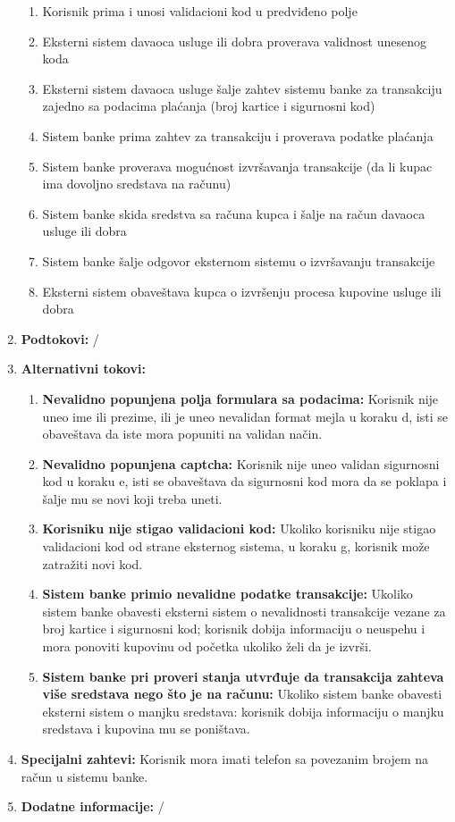 \documentclass{article}
\begin{document}
\begin{enumerate}
\begin{enumerate}
        \item Korisnik prima i unosi validacioni kod u predviđeno polje
        \item Eksterni sistem davaoca usluge ili dobra proverava validnost unesenog koda
        \item Eksterni sistem davaoca usluge šalje zahtev sistemu banke za transakciju zajedno sa podacima plaćanja (broj kartice i sigurnosni kod)
        \item Sistem banke prima zahtev za transakciju i proverava podatke plaćanja
        \item Sistem banke proverava mogućnost izvršavanja transakcije (da li kupac ima dovoljno sredstava na računu)
        \item Sistem banke skida sredstva sa računa kupca i šalje na račun davaoca usluge ili dobra
        \item Sistem banke šalje odgovor eksternom sistemu o izvršavanju transakcije
        \item Eksterni sistem obaveštava kupca o izvršenju procesa kupovine usluge ili dobra
    \end{enumerate}
  \item \textbf{Podtokovi: } /
  \item \textbf{Alternativni tokovi: }
    \begin{enumerate}
        \item \textbf{Nevalidno popunjena polja formulara sa podacima: } Korisnik nije uneo ime ili prezime, ili je uneo nevalidan format mejla u koraku d, isti se obaveštava da iste mora popuniti na validan način.
        \item \textbf{Nevalidno popunjena captcha: } Korisnik nije uneo validan sigurnosni kod u koraku e, isti se obaveštava da sigurnosni kod mora da se poklapa i šalje mu se novi koji treba uneti.
        \item \textbf{Korisniku nije stigao validacioni kod: } Ukoliko korisniku nije stigao validacioni kod od strane eksternog sistema, u koraku g, korisnik može zatražiti novi kod.
        \item \textbf{Sistem banke primio nevalidne podatke transakcije: } Ukoliko sistem banke obavesti eksterni sistem o nevalidnosti transakcije vezane za broj kartice i sigurnosni kod; korisnik dobija informaciju o neuspehu i mora ponoviti kupovinu od početka ukoliko želi da je izvrši.
        \item \textbf{Sistem banke pri proveri stanja utvrđuje da transakcija zahteva više sredstava nego što je na računu: } Ukoliko sistem banke obavesti eksterni sistem o manjku sredstava: korisnik dobija informaciju o 
        manjku sredstava i kupovina mu se poništava.
    \end{enumerate}
  \item \textbf{Specijalni zahtevi: } Korisnik mora imati telefon sa povezanim brojem na račun u sistemu banke.
  \item \textbf{Dodatne informacije: } /
\end{enumerate}
\end{document}
